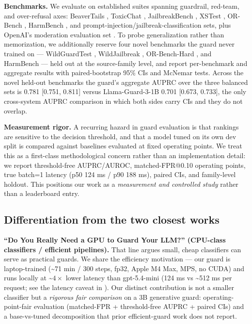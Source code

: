 \documentclass[sigconf,nonacm]{acmart}
\begin{document}
\textbf{Benchmarks.} We evaluate on established suites spanning guardrail, red-team, and over-refusal axes: BeaverTails \cite{ji2023beavertails}, ToxicChat \cite{lin2023toxicchat}, JailbreakBench \cite{chao2024jailbreakbench}, XSTest \cite{rottger2024xstest}, OR-Bench \cite{cui2024orbench}, HarmBench \cite{mazeika2024harmbench}, and prompt-injection/jailbreak-classification sets, plus OpenAI's moderation evaluation set \cite{markov2023holistic}. To probe generalization rather than memorization, we additionally reserve four novel benchmarks the guard never trained on --- WildGuardTest \cite{han2024wildguard}, WildJailbreak \cite{jiang2024wildteaming}, OR-Bench-Hard \cite{cui2024orbench}, and HarmBench \cite{mazeika2024harmbench} --- held out at the source-family level, and report per-benchmark and aggregate results with paired-bootstrap 95\% CIs and McNemar tests. Across the novel held-out benchmarks the guard's aggregate AUPRC over the three balanced sets is 0.781 [0.751, 0.811] versus Llama-Guard-3-1B 0.701 [0.673, 0.733], the only cross-system AUPRC comparison in which both sides carry CIs and they do not overlap.

\textbf{Measurement rigor.} A recurring hazard in guard evaluation is that rankings are sensitive to the decision threshold, and that a model tuned on its own dev split is compared against baselines evaluated at fixed operating points. We treat this as a first-class methodological concern rather than an implementation detail: we report threshold-free AUPRC/AUROC, matched-FPR@0.10 operating points, true batch=1 latency (p50 124 ms / p90 188 ms), paired CIs, and family-level holdout. This positions our work as a \emph{measurement and controlled study} rather than a leaderboard entry.

\subsection{Differentiation from the two closest works}

\textbf{``Do You Really Need a GPU to Guard Your LLM?'' \cite{majhi2025gpuguard} (CPU-class classifiers / efficient pipelines).} That line argues small, cheap classifiers can serve as practical guards. We share the efficiency motivation --- our guard is laptop-trained (\textasciitilde{}71 min / 300 steps, fp32, Apple M4 Max, MPS, no CUDA) and runs locally at \textasciitilde{}$4\times$ lower latency than gpt-5.4-mini (124 ms vs \textasciitilde{}512 ms per request; see the latency caveat in ). Our distinct contribution is not a smaller classifier but a \emph{rigorous fair comparison} on a 3B generative guard: operating-point-fair evaluation (matched-FPR + threshold-free AUPRC + paired CIs) and a base-vs-tuned decomposition that prior efficient-guard work does not report.
\end{document}
